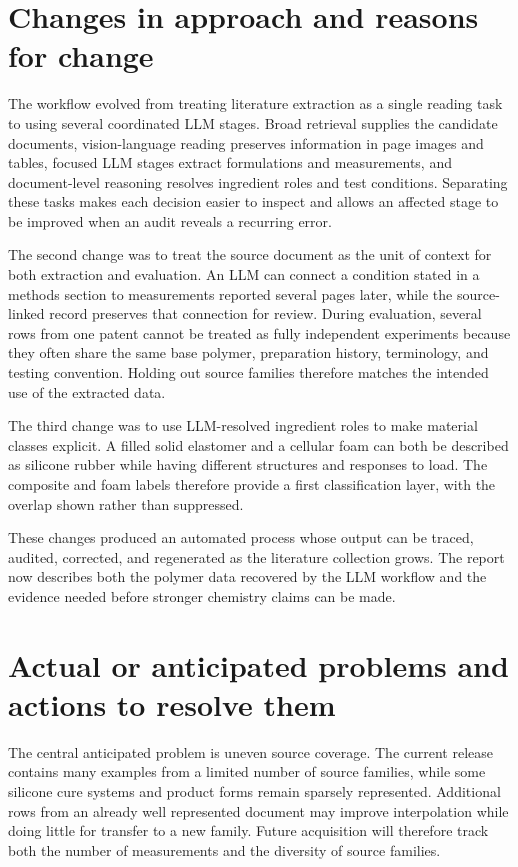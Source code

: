 \documentclass[10pt]{article}
\begin{document}
\section{Changes in approach and reasons for change}
The workflow evolved from treating literature extraction as a single reading
task to using several coordinated LLM stages. Broad retrieval supplies the
candidate documents, vision-language reading preserves information in page
images and tables, focused LLM stages extract formulations and measurements,
and document-level reasoning resolves ingredient roles and test conditions.
Separating these tasks makes each decision easier to inspect and allows an
affected stage to be improved when an audit reveals a recurring error.

The second change was to treat the source document as the unit of context for
both extraction and evaluation. An LLM can connect a condition stated in a
methods section to measurements reported several pages later, while the
source-linked record preserves that connection for review. During evaluation,
several rows from one patent cannot be treated as fully independent experiments
because they often share the same base polymer, preparation history,
terminology, and testing convention. Holding out source families therefore
matches the intended use of the extracted data.

The third change was to use LLM-resolved ingredient roles to make material
classes explicit. A filled solid elastomer and a cellular foam can both be
described as silicone rubber while having different structures and responses
to load. The composite and foam labels therefore provide a first classification
layer, with the overlap shown rather than suppressed.

These changes produced an automated process whose output can be traced,
audited, corrected, and regenerated as the literature collection grows. The
report now describes both the polymer data recovered by the LLM workflow and
the evidence needed before stronger chemistry claims can be made.

\section{Actual or anticipated problems and actions to resolve them}
The central anticipated problem is uneven source coverage. The current release
contains many examples from a limited number of source families, while some
silicone cure systems and product forms remain sparsely represented. Additional
rows from an already well represented document may improve interpolation while
doing little for transfer to a new family. Future acquisition will therefore
track both the number of measurements and the diversity of source families.
\end{document}
